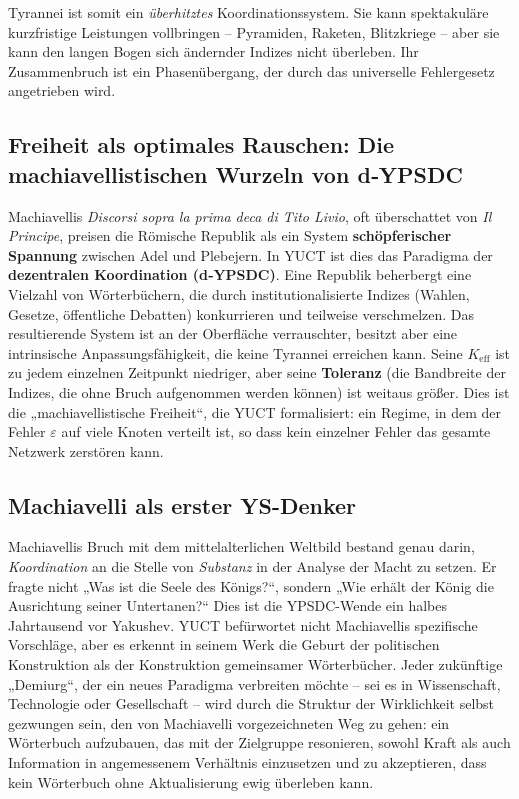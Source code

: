 \documentclass[12pt,a4paper]{article}
\newcommand{\Keff}{K_{\mathrm{eff}}}
\begin{document}
	Tyrannei ist somit ein \emph{überhitztes} Koordinationssystem. Sie kann spektakuläre kurzfristige Leistungen vollbringen – Pyramiden, Raketen, Blitzkriege – aber sie kann den langen Bogen sich ändernder Indizes nicht überleben. Ihr Zusammenbruch ist ein Phasenübergang, der durch das universelle Fehlergesetz angetrieben wird.
	
	\subsection{Freiheit als optimales Rauschen: Die machiavellistischen Wurzeln von d‑YPSDC}
	
	Machiavellis \emph{Discorsi sopra la prima deca di Tito Livio}, oft überschattet von \emph{Il Principe}, preisen die Römische Republik als ein System \textbf{schöpferischer Spannung} zwischen Adel und Plebejern. In YUCT ist dies das Paradigma der \textbf{dezentralen Koordination (d‑YPSDC)}. Eine Republik beherbergt eine Vielzahl von Wörterbüchern, die durch institutionalisierte Indizes (Wahlen, Gesetze, öffentliche Debatten) konkurrieren und teilweise verschmelzen. Das resultierende System ist an der Oberfläche verrauschter, besitzt aber eine intrinsische Anpassungsfähigkeit, die keine Tyrannei erreichen kann. Seine \(\Keff\) ist zu jedem einzelnen Zeitpunkt niedriger, aber seine \textbf{Toleranz} (die Bandbreite der Indizes, die ohne Bruch aufgenommen werden können) ist weitaus größer. Dies ist die „machiavellistische Freiheit“, die YUCT formalisiert: ein Regime, in dem der Fehler \(\varepsilon\) auf viele Knoten verteilt ist, so dass kein einzelner Fehler das gesamte Netzwerk zerstören kann.
	
	\subsection{Machiavelli als erster YS-Denker}
	
	Machiavellis Bruch mit dem mittelalterlichen Weltbild bestand genau darin, \emph{Koordination} an die Stelle von \emph{Substanz} in der Analyse der Macht zu setzen. Er fragte nicht „Was ist die Seele des Königs?“, sondern „Wie erhält der König die Ausrichtung seiner Untertanen?“ Dies ist die YPSDC-Wende ein halbes Jahrtausend vor Yakushev. YUCT befürwortet nicht Machiavellis spezifische Vorschläge, aber es erkennt in seinem Werk die Geburt der politischen Konstruktion als der Konstruktion gemeinsamer Wörterbücher. Jeder zukünftige „Demiurg“, der ein neues Paradigma verbreiten möchte – sei es in Wissenschaft, Technologie oder Gesellschaft – wird durch die Struktur der Wirklichkeit selbst gezwungen sein, den von Machiavelli vorgezeichneten Weg zu gehen: ein Wörterbuch aufzubauen, das mit der Zielgruppe resonieren, sowohl Kraft als auch Information in angemessenem Verhältnis einzusetzen und zu akzeptieren, dass kein Wörterbuch ohne Aktualisierung ewig überleben kann.
	
\end{document}

